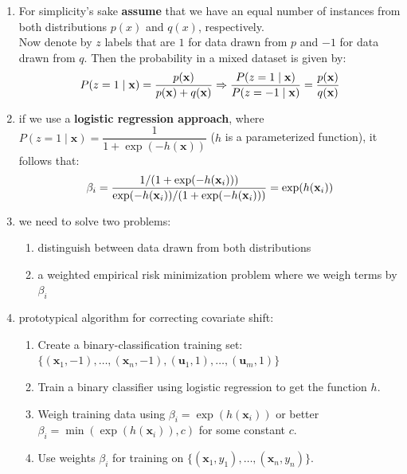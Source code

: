 \begin{enumerate}[itemsep=0.2cm]
    \item For simplicity’s sake \textbf{assume} that we have an equal number of instances from both distributions $p(x)$ and $q(x)$, respectively.\\
    Now denote by $z$ labels that are $1$ for data drawn from $p$ and $-1$ for data drawn from $q$. Then the probability in a mixed dataset is given by:
    \[
        \hfill
        P(z=1 \mid \mathbf{x}) = \dfrac{p(\mathbf{x})}{p(\mathbf{x})+q(\mathbf{x})}
        \hfill
        \Rightarrow
        \dfrac{P(z=1 \mid \mathbf{x})}{P(z=-1 \mid \mathbf{x})} = \dfrac{p(\mathbf{x})}{q(\mathbf{x})}
        \hfill
    \]

    \item if we use a \textbf{logistic regression approach}, where $P(z=1 \mid \mathbf{x})=\dfrac{1}{1+\exp(-h(\mathbf{x}))}$ ($h$ is a parameterized function), it follows that:
    \[
        \hfill
        \beta_i = \dfrac{1/(1 + \exp(-h(\mathbf{x}_i)))}{\exp(-h(\mathbf{x}_i))/(1 + \exp(-h(\mathbf{x}_i)))} = \exp(h(\mathbf{x}_i))
        \hfill
    \]

    \item we need to solve two problems:
    \begin{enumerate}
        \item distinguish between data drawn from both distributions
        \item a weighted empirical risk minimization problem where we weigh terms by $\beta_i$
    \end{enumerate}

    \item prototypical algorithm for correcting covariate shift:
    \begin{enumerate}[itemsep=0.1cm]
        \item Create a binary-classification training set: $\{(\mathbf{x}_1, -1), \ldots, (\mathbf{x}_n, -1), (\mathbf{u}_1, 1), \ldots, (\mathbf{u}_m, 1)\}$

        \item Train a binary classifier using logistic regression to get the function $h$.

        \item Weigh training data using $\beta_i = \exp(h(\mathbf{x}_i))$ or better $\beta_i = \min(\exp(h(\mathbf{x}_i)), c)$ for some constant $c$.

        \item Use weights $\beta_i$ for training on $\{(\mathbf{x}_1, y_1), \ldots, (\mathbf{x}_n, y_n)\}$.

    \end{enumerate}

\end{enumerate}



